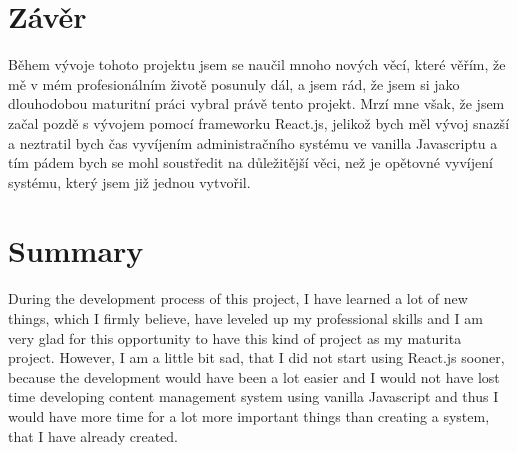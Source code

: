 \documentclass[12pt,a4paper]{report}
\begin{document}
  \clearpage
  \section*{Závěr}
  Během vývoje tohoto projektu jsem se naučil mnoho nových věcí, které věřím, že mě v mém
  profesionálním životě posunuly dál, a jsem rád, že jsem si jako dlouhodobou maturitní práci
  vybral právě tento projekt. Mrzí mne však, že jsem začal pozdě s vývojem pomocí frameworku
  React.js, jelikož bych měl vývoj snazší a neztratil bych čas vyvíjením administračního systému ve
  vanilla Javascriptu a tím pádem bych se mohl soustředit na důležitější věci, než je opětovné
  vyvíjení systému, který jsem již jednou vytvořil.
  \section*{Summary}
  During the development process of this project, I have learned a lot of new things,
  which I firmly believe, have leveled up my professional skills  and I am very glad for this opportunity to have
  this kind of project as my maturita project. However, I am a little bit sad, that I did not start
  using React.js sooner, because the development would have been a lot easier and I would not have lost time 
  developing content management system using vanilla Javascript and thus I would have more time for a lot more important 
  things than creating a system, that I have already created.
\end{document}
